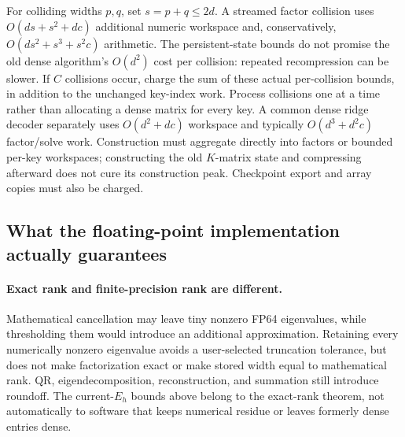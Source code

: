 \documentclass[11pt,a4paper]{article}
\begin{document}
For colliding widths $p,q$, set $s=p+q\le2d$. A streamed factor collision
uses $O(ds+s^2+dc)$ additional numeric workspace and, conservatively,
$O(ds^2+s^3+s^2c)$ arithmetic. The persistent-state bounds do not promise
the old dense algorithm's $O(d^2)$ cost per collision: repeated
recompression can be slower. If $C$ collisions occur, charge the sum of
these actual per-collision bounds, in addition to the unchanged key-index
work. Process collisions one at a time rather than allocating a dense
matrix for every key. A common dense ridge decoder separately uses
$O(d^2+dc)$ workspace and typically $O(d^3+d^2c)$ factor/solve work.
Construction must aggregate directly into factors or bounded per-key
workspaces; constructing the old $K$-matrix state and compressing afterward
does not cure its construction peak. Checkpoint export and array copies
must also be charged.

\subsection{What the floating-point implementation actually guarantees}
\paragraph{Exact rank and finite-precision rank are different.}
Mathematical cancellation may leave tiny nonzero FP64 eigenvalues, while
thresholding them would introduce an additional approximation. Retaining
every numerically nonzero eigenvalue avoids a user-selected truncation
tolerance, but does not make factorization exact or make stored width equal
to mathematical rank. QR, eigendecomposition, reconstruction, and summation
still introduce roundoff. The current-$E_h$ bounds above belong to the
exact-rank theorem, not automatically to software that keeps numerical
residue or leaves formerly dense entries dense.
\end{document}
